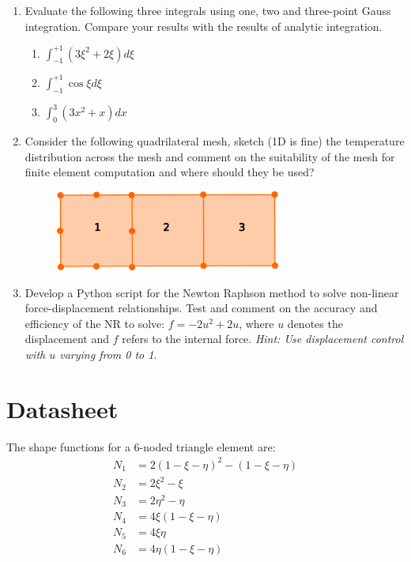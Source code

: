\documentclass[a4paper,12pt]{article}
\begin{document}
\begin{enumerate}
	\item Evaluate the following three integrals using one, two and three-point Gauss integration.
	Compare your results with the results of analytic integration.
		\begin{enumerate}
			\item $\int_{-1}^{+1}(3\xi^2 + 2\xi) d\xi$
			\item $\int_{-1}^{+1} \cos \xi d\xi$
			\item $\int_{0}^{3} (3x^2 + x) dx$
		\end{enumerate}
		
	\item Consider the following quadrilateral mesh, sketch (1D is fine) the temperature distribution across the mesh and comment on the suitability of the mesh for finite element computation and where should they be used?
				
		\begin{figure}[!h]
			\centering
			\includegraphics[width=0.7\textwidth]{figs/transition-elements.png}
		\end{figure}

	\item Develop a Python script for the Newton Raphson method to solve non-linear force-displacement relationships. Test and comment on the accuracy and efficiency of the NR to solve: $f = - 2 u^2 + 2 u$, where $u$ denotes the displacement and $f$ refers to the internal force. \textit{Hint: Use displacement control with $u$ varying from 0 to 1}.
\end{enumerate}

\section*{Datasheet}
The shape functions for a 6-noded triangle element are:
\begin{align*}
N_1 & = 2(1-\xi -\eta)^2 - (1 -\xi -\eta)\\
N_2 & = 2\xi^2 -\xi\\
N_3 & = 2\eta^2 -\eta\\
N_4 & = 4\xi(1 - \xi - \eta)\\
N_5 & = 4\xi\eta \\
N_6 & = 4 \eta(1 - \xi - \eta)\\
\end{align*}
\end{document}
